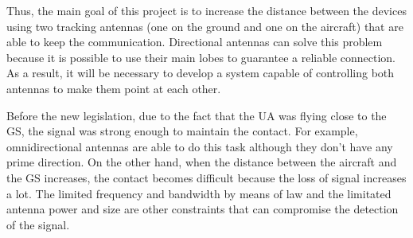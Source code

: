 Thus, the main goal of this project is to increase the distance between the devices using two tracking antennas (one on the ground and one on the aircraft) that are able to keep the communication. Directional antennas can solve this problem  because it is possible to use their main lobes to guarantee a reliable connection. As a result, it will be necessary to develop a system capable of controlling both antennas to make them point at each other.



Before the new legislation, due to the fact that the UA was flying close to the GS, the signal was strong enough to maintain the contact. For example, omnidirectional antennas are able to do this task although they don't have any prime direction. On the other hand, when the distance between the aircraft and the GS increases, the contact becomes difficult because the loss of signal increases a lot. The limited frequency and bandwidth by means of law and the limitated antenna power and size are other constraints that can compromise the detection of the signal. 


